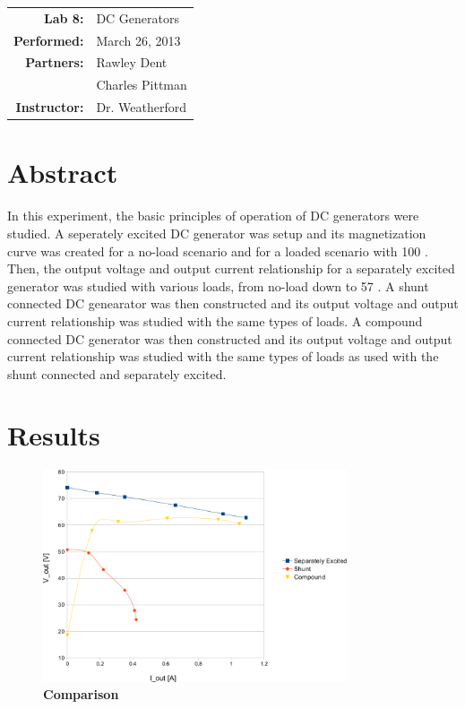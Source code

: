 \documentclass{article}
\begin{document}
\begin{tabular}{rl}
  \textbf{Lab 8:} & DC Generators \\
  \textbf{Performed:} & March 26, 2013 \\
  \textbf{Partners:} & Rawley Dent \\ & Charles Pittman \\
  \textbf{Instructor:} & Dr. Weatherford
\end{tabular}


\section*{Abstract}

In this experiment, the basic principles of operation of DC generators were studied. A seperately excited 
DC generator was setup and its magnetization curve was created for a no-load scenario and for a loaded 
scenario with 100 \Omega. Then, the output voltage and output current relationship for a separately excited
generator was studied with various loads, from no-load down to 57 \Omega. A shunt connected DC genearator was
then constructed and its output voltage and output current relationship was studied with the same types of 
loads. A compound connected DC generator was then constructed and its output voltage and output current 
relationship was studied with the same types of loads as used with the shunt connected and separately excited.

\section*{Results}

\begin{figure}[H]
  \centering
    \includegraphics[width=0.8\textwidth]{img/graph}
    \caption{\textbf{Comparison}}
    \label{fig:graph}
\end{figure}
\end{document}
